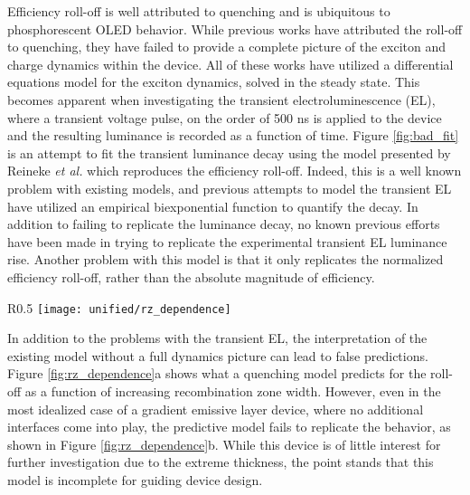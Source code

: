 \documentclass[../thesis.tex]{subfiles}
\begin{document}
Efficiency roll-off is well attributed to quenching and is ubiquitous to phosphorescent OLED behavior.\supercite{Reineke2007,Erickson2014,Murawski2013,Giebink2008c}
While previous works have attributed the roll-off to quenching, they have failed to provide a complete picture of the exciton and charge dynamics within the device.
All of these works have utilized a differential equations model for the exciton dynamics, solved in the steady state.
This becomes apparent when investigating the transient electroluminescence (EL), where a transient voltage pulse, on the order of 500 ns is applied to the device and the resulting luminance is recorded as a function of time.  
Figure \ref{fig:bad_fit} is an attempt to fit the transient luminance decay using the model presented by Reineke \textit{et al.}\supercite{Reineke2007} which reproduces the efficiency roll-off.  
Indeed, this is a well known problem with existing models, and previous attempts to model the transient EL have utilized an empirical biexponential function to quantify the decay.\supercite{Erickson2014,Giebink2008c,Baldo2000a,Zhang2012}
In addition to failing to replicate the luminance decay, no known previous efforts have been made in trying to replicate the experimental transient EL luminance rise.
Another problem with this model is that it only replicates the normalized efficiency roll-off, rather than the absolute magnitude of efficiency.

\begin{wrapfigure}{R}{0.5\textwidth}
\centering
\texttt{[image: unified/rz\_dependence]}
\caption{(a) Efficiency roll-off predicted by Erickson \textit{et al.} 2014 as a function of recombination zone width.\supercite{Erickson2014} (b) Observed efficiency roll-off for gradient EML devices.}
\label{fig:rz_dependence}
\end{wrapfigure}

In addition to the problems with the transient EL, the interpretation of the existing model without a full dynamics picture can lead to false predictions.  
Figure \ref{fig:rz_dependence}a shows what a quenching model predicts for the roll-off as a function of increasing recombination zone width.\supercite{Erickson2014}
However, even in the most idealized case of a gradient emissive layer device, where no additional interfaces come into play, the predictive model fails to replicate the behavior, as shown in Figure \ref{fig:rz_dependence}b.
While this device is of little interest for further investigation due to the extreme thickness, the point stands that this model is incomplete for guiding device design.
\end{document}
